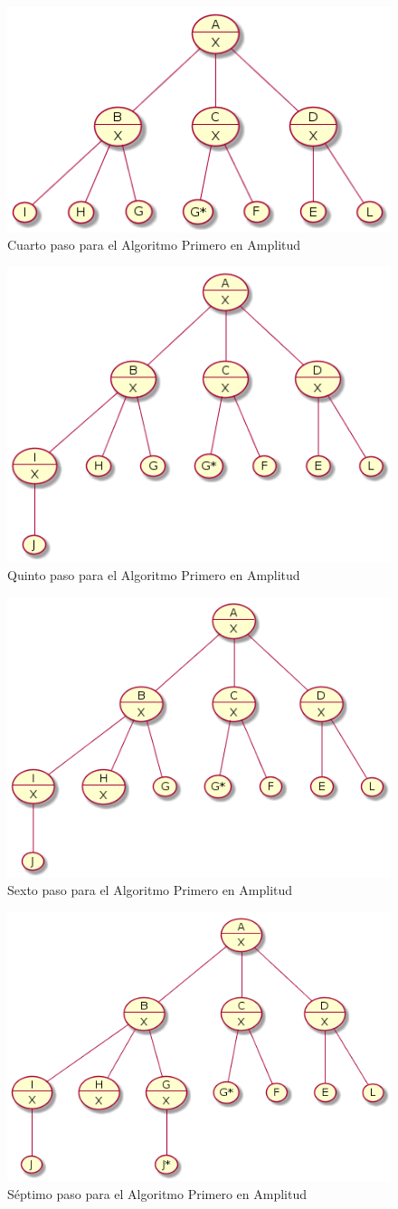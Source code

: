 \documentclass{article}
\begin{document}
\begin{figure}[H]
  \centering
  \includegraphics[width=.4\linewidth]{EJ4/ej4_003.png}
  \caption{Cuarto paso para el Algoritmo Primero en Amplitud}
  \label{gr:g17}
\end{figure}

\begin{figure}[H]
  \centering
  \includegraphics[width=.4\linewidth]{EJ4/ej4_004.png}
  \caption{Quinto paso para el Algoritmo Primero en Amplitud}
  \label{gr:g18}
\end{figure}

\begin{figure}[H]
  \centering
  \includegraphics[width=.4\linewidth]{EJ4/ej4_005.png}
  \caption{Sexto paso para el Algoritmo Primero en Amplitud}
  \label{gr:g19}
\end{figure}

\begin{figure}[H]
  \centering
  \includegraphics[width=.4\linewidth]{EJ4/ej4_006.png}
  \caption{S\'eptimo paso para el Algoritmo Primero en Amplitud}
  \label{gr:g20}
\end{figure}
\end{document}
